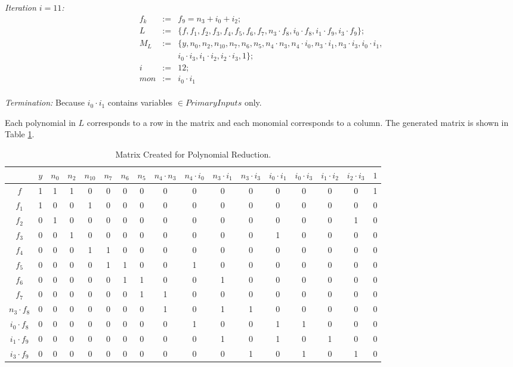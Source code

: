 \begin{Example}
	{\it Iteration $i=11$:}
	\begin{eqnarray}
		f_{k}&:=&f_{9}=n_3+i_0+i_2; \nonumber \\
		L&:=&\{ f,f_1,f_{2},f_{3},f_{4},f_{5},f_{6},f_{7},n_3 \cdot f_{8}, i_{0} \cdot f_{8},i_1 \cdot f_{9}, i_3 \cdot f_{9}\}; \nonumber \\
		M_{L}&:=&\{ y,n_0,n_2,n_{10},n_7,n_6,n_5,n_4\cdot n_3,n_4\cdot i_0, n_3\cdot i_1,n_3\cdot i_3,i_0\cdot i_1,\nonumber \\
		&{}&i_0\cdot i_3, i_1\cdot i_2,i_2\cdot i_3,1\}; \nonumber \\
		i&:=&12;  \nonumber \\
		mon&:=& i_0\cdot i_1 \nonumber 
	\end{eqnarray}\\
	
	{\it Termination:} Because $i_0\cdot i_1$ contains variables
        $\in PrimaryInputs$ only.
	
	Each polynomial in $L$ corresponds to a row in the matrix and
        each monomial corresponds to a column. The generated matrix is
        shown in Table \ref{tab:matrixcons}. 
	
	\begin{table} 
	\begin{center}
	\caption{Matrix Created for Polynomial Reduction.} 
	\label{tab:matrixcons}
	\begin{tabular}{|c||c|c|c|c|c|c|c|c|c|c|c|c|c|c|c|c|} \hline 
				&$y$ 	&$n_0$ &$n_2$	&$n_{10}$	 &$n_7$	&$n_6$  &$n_5$   &$n_4\cdot n_3$  &$n_4\cdot i_0$ 	&$n_3\cdot i_1$	&$n_3\cdot i_3$	&$i_0\cdot i_1$		&$i_0\cdot i_3$ 	&$i_1\cdot i_2$	 &$i_2\cdot i_3$   &$1$ \\
		\hline
		$f$   		&1	&1	&1	&0		&0	&0	&0	&0	&0	&0	&0	&0	&0	&0	&0	&1 \\
		\hline
		$f_1$ 		&1	&0	&0	&1		&0	&0	&0	&0	&0	&0	&0	&0	&0	&0	&0	&0 \\
		\hline
		$f_2$ 		&0	&1	&0	&0		&0	&0	&0	&0	&0	&0	&0	&0	&0	&0	&1	&0 \\
		\hline
		$f_3$		&0	&0	&1	&0		&0	&0	&0	&0	&0	&0	&0	&1	&0	&0	&0	&0 \\
		\hline
		$f_4$		&0	&0	&0	&1		&1	&0	&0	&0	&0	&0	&0	&0	&0	&0	&0	&0\\
		\hline{}
		$f_5$		&0	&0	&0	&0		&1	&1	&0	&0	&1	&0	&0	&0	&0	&0	&0	&0\\
		\hline{}
		$f_6$		&0	&0	&0	&0		&0	&1	&1	&0	&0	&1	&0	&0	&0	&0	&0	&0\\
		\hline{}
		$f_7$		&0	&0	&0	&0		&0	&0	&1	&1	&0	&0	&0	&0	&0	&0	&0	&0\\
	\hline{}
$n_3\cdot f_{8}$	&0	&0	&0	&0		&0	&0	&0	&1	&0	&1	&1	&0	&0	&0	&0	&0\\
	\hline{}
$i_0\cdot f_{8}$ 	&0	&0	&0	&0		&0	&0	&0	&0	&1	&0	&0	&1	&1	&0	&0	&0\\
	\hline{}
$i_1 \cdot f_{9}$	&0	&0	&0	&0		&0	&0	&0	&0	&0	&1	&0	&1	&0	&1	&0	&0\\
	\hline{}
$i_3 \cdot f_{9}$	&0	&0	&0	&0		&0	&0	&0	&0	&0	&0	&1	&0	&1	&0	&1	&0\\
	\hline
	\end{tabular}
	\end{center}
	\end{table} 
	

\end{Example}
